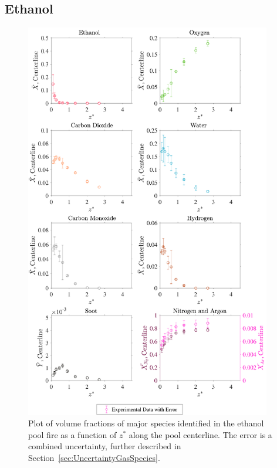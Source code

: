 \documentclass[12pt]{article}
\begin{document}
\subsection{Ethanol}
\label{ssec:Ethanol_ALL_Vol_Frac}

\begin{figure}[!h]
	\centering
\includegraphics[width=10.75cm,keepaspectratio]{Ethanol_MOL_FRAC_Plot.pdf}
	\caption[Volume fractions of major species in the ethanol plume]{Plot of volume fractions of major species identified in the ethanol pool fire as a function of $z^{*}$ along the pool centerline. The error is a combined uncertainty, further described in Section~\ref{sec:UncertaintyGasSpecies}.}
	\label{fig:Ethanol_VOL_Frac_Major}
\end{figure}
\pagebreak
\end{document}
